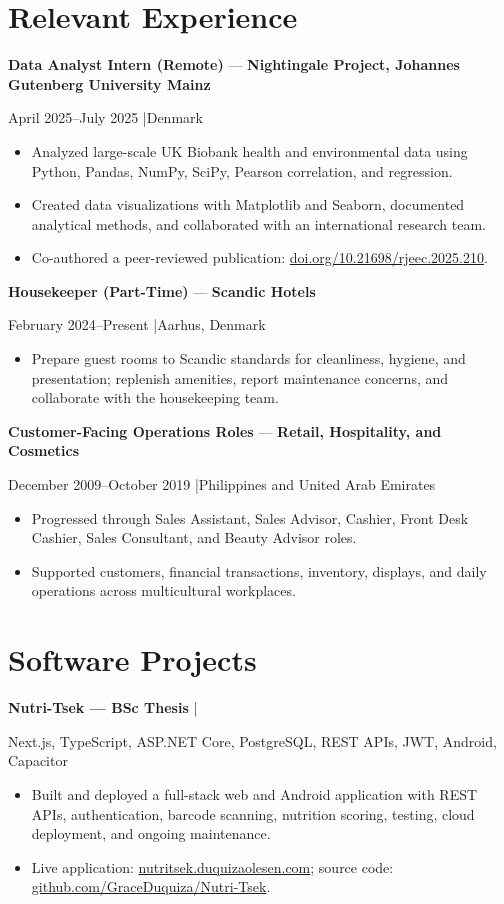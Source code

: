 \documentclass[10pt,a4paper]{article}
\newcommand{\role}[4]{%
  \textbf{#1} --- \textbf{#2}\par
  #3 \enspace|\enspace #4\par
}
\newcommand{\project}[3]{%
  \textbf{#1} \enspace|\enspace #2\par
  #3\par
}
\begin{document}
\section{Relevant Experience}
\role{Data Analyst Intern (Remote)}{Nightingale Project, Johannes Gutenberg University Mainz}{April 2025--July 2025}{Denmark}
\begin{itemize}
  \item Analyzed large-scale UK Biobank health and environmental data using Python, Pandas, NumPy, SciPy, Pearson correlation, and regression.
  \item Created data visualizations with Matplotlib and Seaborn, documented analytical methods, and collaborated with an international research team.
  \item Co-authored a peer-reviewed publication: \href{https://doi.org/10.21698/rjeec.2025.210}{doi.org/10.21698/rjeec.2025.210}.
\end{itemize}

\role{Housekeeper (Part-Time)}{Scandic Hotels}{February 2024--Present}{Aarhus, Denmark}
\begin{itemize}
  \item Prepare guest rooms to Scandic standards for cleanliness, hygiene, and presentation; replenish amenities, report maintenance concerns, and collaborate with the housekeeping team.
\end{itemize}

\role{Customer-Facing Operations Roles}{Retail, Hospitality, and Cosmetics}{December 2009--October 2019}{Philippines and United Arab Emirates}
\begin{itemize}
  \item Progressed through Sales Assistant, Sales Advisor, Cashier, Front Desk Cashier, Sales Consultant, and Beauty Advisor roles.
  \item Supported customers, financial transactions, inventory, displays, and daily operations across multicultural workplaces.
\end{itemize}

\section{Software Projects}
\project{Nutri-Tsek --- BSc Thesis}{2026}{Next.js, TypeScript, ASP.NET Core, PostgreSQL, REST APIs, JWT, Android, Capacitor}
\begin{itemize}
  \item Built and deployed a full-stack web and Android application with REST APIs, authentication, barcode scanning, nutrition scoring, testing, cloud deployment, and ongoing maintenance.
  \item Live application: \href{https://nutritsek.duquizaolesen.com}{nutritsek.duquizaolesen.com}; source code: \href{https://github.com/GraceDuquiza/Nutri-Tsek}{github.com/GraceDuquiza/Nutri-Tsek}.
\end{itemize}
\end{document}
